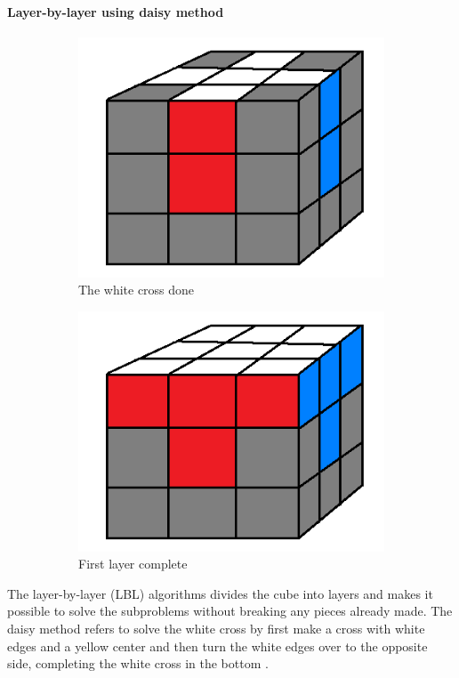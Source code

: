 \documentclass[a4paper,11pt]{kth-mag}
\begin{document}
\paragraph{Layer-by-layer using daisy method}
\begin{figure}[b]
	\centering
	\begin{subfigure}[!b]{0.3\textwidth}
		\includegraphics[width=\textwidth]{figs/step1.png}
		\caption{The white cross done}
		\label{fig_4}
	\end{subfigure}
	\begin{subfigure}[!b]{0.3\textwidth}
		\includegraphics[width=\textwidth]{figs/step2.png}
		\caption{First layer complete}
		\label{fig_5}
	\end{subfigure}
	\caption{}
\end{figure}
The layer-by-layer (LBL) algorithms divides the cube into layers and makes it possible to solve the subproblems without breaking any pieces already made. 
The daisy method refers to solve the white cross by first make a cross with white edges and a yellow center and then turn the white edges over to the opposite side, completing the white cross in the bottom \cite{Shellie}.
\end{document}
